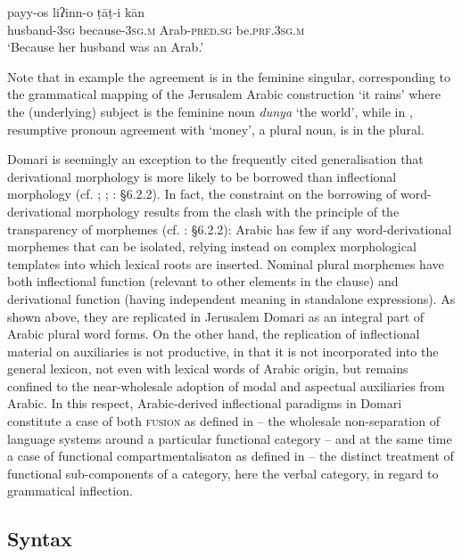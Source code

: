 \documentclass[output=paper]{langsci/langscibook}
\begin{document}
\ea \gll     payy-os liʔinn-o ṭāṭ-i kān\\
       husband-\textsc{3sg} because-\textsc{3sg.m} Arab-\textsc{pred.sg} be.\textsc{prf.3sg.m}\\
\glt   ‘Because her husband was an Arab.’
\z

Note that in example  the agreement is in the feminine singular, corresponding to the grammatical mapping of the Jerusalem Arabic construction ‘it rains’ where the (underlying) subject is the feminine noun \textit{dunya} ‘the world’, while in , resumptive pronoun agreement with ‘money’, a plural noun, is in the plural.

Domari is seemingly an exception to the frequently cited generalisation that derivational morphology is more likely to be borrowed than inflectional morphology (cf. \citealt{Moravcsik1978}; \citealt{Field2002}; \citealt{Matras2009}: §6.2.2). In fact, the constraint on the borrowing of word-derivational morphology results from the clash with the principle of the transparency of morphemes (cf. \citealt{Matras2009}: §6.2.2): Arabic has few if any word-derivational morphemes that can be isolated, relying instead on complex morphological templates into which lexical roots are inserted. Nominal plural morphemes have both inflectional function (relevant to other elements in the clause) and derivational function (having independent meaning in standalone expressions). As shown above, they are replicated in Jerusalem Domari as an integral part of Arabic plural word forms. On the other hand, the replication of inflectional material on auxiliaries is not productive, in that it is not incorporated into the general lexicon, not even with lexical words of Arabic origin, but remains confined to the near-wholesale adoption of modal and aspectual auxiliaries from Arabic. In this respect, Arabic-derived inflectional paradigms in Domari constitute a case of both \textsc{fusion} as defined in \citet{Matras2009} – the wholesale non-separation of language systems around a particular functional category – and at the same time a case of functional compartmentalisaton as defined in \citet{Matras2015} – the distinct treatment of functional sub-components of a category, here the verbal category, in regard to grammatical inflection. 

\subsection{Syntax
}
\end{document}
